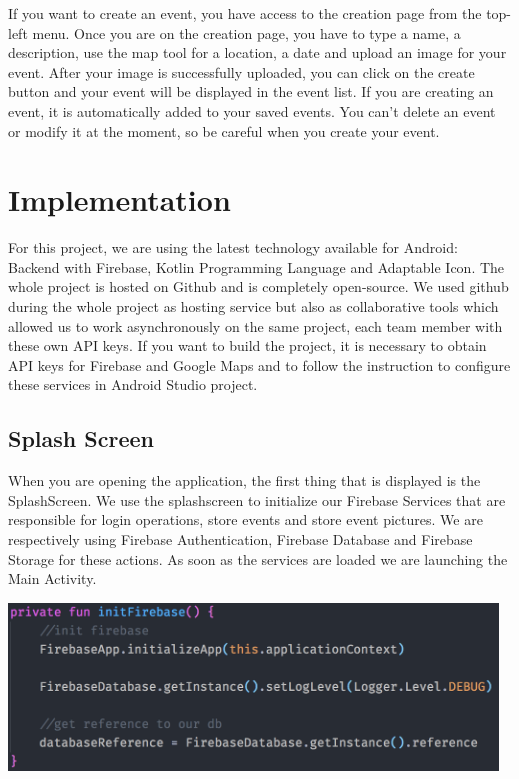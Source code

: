 \documentclass[a4paper,11pt, oneside]{book}
\begin{document}
	If you want to create an event, you have access to the creation page from the top-left menu.
	Once you are on the creation page, you have to type a name, a description, use the map tool for a location, 
	a date and upload an image for your event. After your image is successfully uploaded, you can click on 
	the create button and your event will be displayed in the event list. If you are creating an event, it is
	automatically added to your saved events. You can't delete an event or modify it at the moment, so be careful when you create your event. 
	
	\chapter{Implementation}

	For this project, we are using the latest technology available for Android: Backend with Firebase, Kotlin Programming 
	Language and Adaptable Icon. The whole project is hosted on Github and is completely open-source. We used github 
	during the whole project as hosting service but also as collaborative tools which allowed us to work asynchronously on
	the same project, each team member with these own API keys. If you want to build the project, it is necessary to obtain
	API keys for Firebase and Google Maps and to follow the instruction to configure these services in Android Studio project. 


		\section{Splash Screen}

		When you are opening the application, the first thing that is displayed is the SplashScreen.
		We use the splashscreen to initialize our Firebase Services that are responsible for
		login operations, store events and store event pictures. We are respectively using
		Firebase Authentication, Firebase Database and Firebase Storage for these actions.
		As soon as the services are loaded we are launching the Main Activity.

		\includegraphics[width=13cm]{./img/initfire.png}
\end{document}
